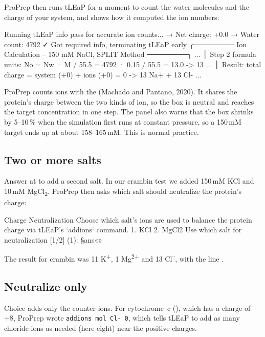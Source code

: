\medskip
ProPrep then runs tLEaP for a moment to count the water molecules and the
charge of your system, and shows how it computed the ion numbers:

\begin{screen}
Running tLEaP info pass for accurate ion counts...
  → Net charge: +0.0
  → Water count: 4792
  ✓ Got required info, terminating tLEaP early
╭──────── Ion Calculation -- 150 mM NaCl, SPLIT Method ────────╮
...
│    Step 2  formula units:  No = Nw · M / 55.5 = 4792 · 0.15 / 55.5 = 13.0 -> 13
...
│  Result: total charge = system (+0) + ions (+0) = 0  ->  13 Na+ + 13 Cl-
...
\end{screen}

\begin{behindscenes}
ProPrep counts ions with the  (Machado and Pantano,
2020). It shares the protein's charge between the two kinds of ion, so the box
is neutral and reaches the target concentration in one step. The panel also
warns that the box shrinks by 5--10\,\% when the simulation first runs at
constant pressure, so a 150\,mM target ends up at about 158--165\,mM. This is
normal practice.
\end{behindscenes}

\subsection{Two or more salts}

Answer  at  to add a second salt. In our
crambin test we added 150\,mM KCl and 10\,mM MgCl\textsubscript{2}. ProPrep
then asks which salt should neutralize the protein's charge:

\begin{screen}
Charge Neutralization
Choose which salt's ions are used to balance the protein charge via tLEaP's
`addions` command.
  1. KCl
  2. MgCl2
Use which salt for neutralization [1/2] (1): §ans«»
\end{screen}

The result for crambin was 11 K\textsuperscript{+}, 1 Mg\textsuperscript{2+}
and 13 Cl\textsuperscript{--}, with the line .

\subsection{Neutralize only}

Choice  adds only the counter-ions. For cytochrome~c (),
which has a charge of +8, ProPrep wrote \texttt{addions mol Cl- 0}, which tells
tLEaP to add as many chloride ions as needed (here eight) near the positive
charges.

